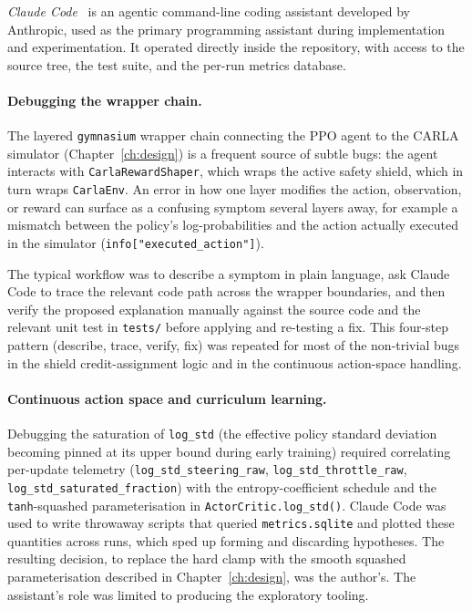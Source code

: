 \textit{Claude Code}~\cite{anthropic2025claudecode} is an agentic command-line coding
assistant developed by Anthropic, used as the primary programming assistant during
implementation and experimentation. It operated directly inside the repository, with
access to the source tree, the test suite, and the per-run metrics database.

\paragraph{Debugging the wrapper chain.}
The layered \texttt{gymnasium} wrapper chain connecting the PPO agent to the CARLA
simulator (Chapter~\ref{ch:design}) is a frequent source of subtle bugs: the
agent interacts with \texttt{CarlaRewardShaper}, which wraps the active safety shield,
which in turn wraps \texttt{CarlaEnv}. An error in how one layer modifies the action,
observation, or reward can surface as a confusing symptom several layers away, for
example a mismatch between the policy's log-probabilities and the action actually
executed in the simulator (\texttt{info["executed\_action"]}).

The typical workflow was to describe a symptom in plain language, ask Claude Code to
trace the relevant code path across the wrapper boundaries, and then verify the proposed
explanation manually against the source code and the relevant unit test in
\texttt{tests/} before applying and re-testing a fix. This four-step pattern
(describe, trace, verify, fix) was repeated for most of the non-trivial bugs in the
shield credit-assignment logic and in the continuous action-space handling.

\paragraph{Continuous action space and curriculum learning.}
Debugging the saturation of \texttt{log\_std} (the effective policy standard deviation
becoming pinned at its upper bound during early training) required correlating
per-update telemetry (\texttt{log\_std\_steering\_raw}, \texttt{log\_std\_throttle\_raw},
\texttt{log\_std\_saturated\_fraction}) with the entropy-coefficient schedule and the
\texttt{tanh}-squashed parameterisation in \texttt{ActorCritic.log\_std()}. Claude Code
was used to write throwaway scripts that queried \texttt{metrics.sqlite} and plotted
these quantities across runs, which sped up forming and discarding hypotheses. The
resulting decision, to replace the hard clamp with the smooth squashed parameterisation
described in Chapter~\ref{ch:design}, was the author's. The assistant's role was
limited to producing the exploratory tooling.

